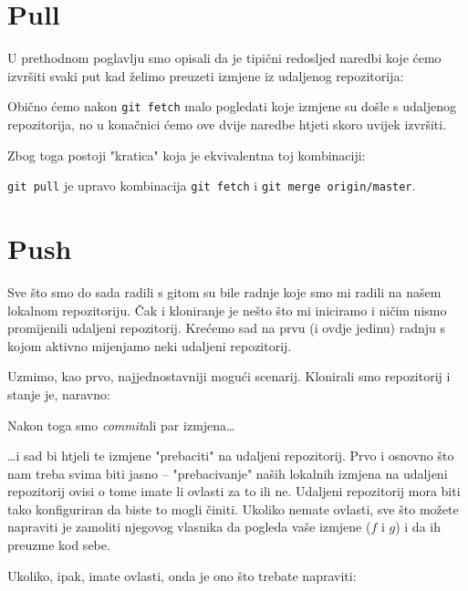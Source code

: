 

\section*{Pull}

U prethodnom poglavlju smo opisali da je tipični redosljed naredbi koje ćemo izvršiti svaki put kad želimo preuzeti izmjene iz udaljenog repozitorija:


Obično ćemo nakon \verb+git fetch+ malo pogledati koje izmjene su došle s udaljenog repozitorija, no u konačnici ćemo ove dvije naredbe htjeti skoro uvijek izvršiti.

Zbog toga postoji "kratica" koja je ekvivalentna toj kombinaciji:


\verb+git pull+ je upravo kombinacija \verb+git fetch+ i \verb+git merge origin/master+.

\section*{Push}

Sve što smo do sada radili s gitom su bile radnje koje smo mi radili na našem lokalnom repozitoriju.
Čak i kloniranje je nešto što mi iniciramo i ničim nismo promijenili udaljeni repozitorij.
Krećemo sad na prvu (i ovdje jedinu) radnju s kojom aktivno mijenjamo neki udaljeni repozitorij.

Uzmimo, kao prvo, najjednostavniji mogući scenarij.
Klonirali smo repozitorij i stanje je, naravno:



Nakon toga smo \emph{commit}ali par izmjena\dots



\dots{}i sad bi htjeli te izmjene "prebaciti" na udaljeni repozitorij.
Prvo i osnovno što nam treba svima biti jasno -- "prebacivanje" naših lokalnih izmjena na udaljeni repozitorij ovisi o tome imate li ovlasti za to ili ne.
Udaljeni repozitorij mora biti tako konfiguriran da biste to mogli činiti.
Ukoliko nemate ovlasti, sve što možete napraviti je zamoliti njegovog vlasnika da pogleda vaše izmjene ($f$ i $g$) i da ih preuzme kod sebe.

Ukoliko, ipak, imate ovlasti, onda je ono što trebate napraviti:

